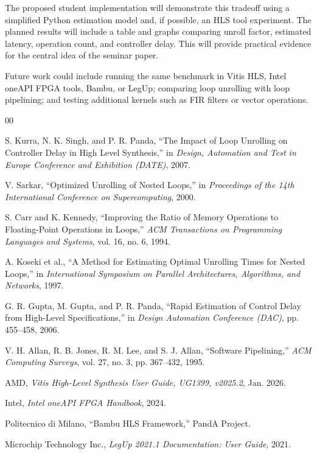 \documentclass[conference]{IEEEtran}
\begin{document}
The proposed student implementation will demonstrate this tradeoff using a simplified Python estimation model and, if possible, an HLS tool experiment. The planned results will include a table and graphs comparing unroll factor, estimated latency, operation count, and controller delay. This will provide practical evidence for the central idea of the seminar paper.

Future work could include running the same benchmark in Vitis HLS, Intel oneAPI FPGA tools, Bambu, or LegUp; comparing loop unrolling with loop pipelining; and testing additional kernels such as FIR filters or vector operations.

\begin{thebibliography}{00}

S. Kurra, N. K. Singh, and P. R. Panda, 
``The Impact of Loop Unrolling on Controller Delay in High Level Synthesis,'' 
in \textit{Design, Automation and Test in Europe Conference and Exhibition (DATE)}, 2007.

V. Sarkar, 
``Optimized Unrolling of Nested Loops,'' 
in \textit{Proceedings of the 14th International Conference on Supercomputing}, 2000.

S. Carr and K. Kennedy, 
``Improving the Ratio of Memory Operations to Floating-Point Operations in Loops,'' 
\textit{ACM Transactions on Programming Languages and Systems}, 
vol. 16, no. 6, 1994.

A. Koseki et al., 
``A Method for Estimating Optimal Unrolling Times for Nested Loops,'' 
in \textit{International Symposium on Parallel Architectures, Algorithms, and Networks}, 1997.

G. R. Gupta, M. Gupta, and P. R. Panda, 
``Rapid Estimation of Control Delay from High-Level Specifications,'' 
in \textit{Design Automation Conference (DAC)}, pp. 455--458, 2006.

V. H. Allan, R. B. Jones, R. M. Lee, and S. J. Allan, 
``Software Pipelining,'' 
\textit{ACM Computing Surveys}, 
vol. 27, no. 3, pp. 367--432, 1995.

AMD, 
\textit{Vitis High-Level Synthesis User Guide, UG1399, v2025.2}, 
Jan. 2026.

Intel, 
\textit{Intel oneAPI FPGA Handbook}, 
2024.

Politecnico di Milano, 
``Bambu HLS Framework,'' 
PandA Project.

Microchip Technology Inc., 
\textit{LegUp 2021.1 Documentation: User Guide}, 
2021.

\end{thebibliography}
\end{document}
